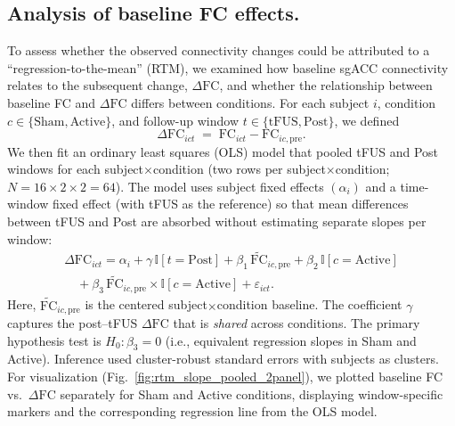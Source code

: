 \subsection*{Analysis of baseline FC effects.}
\noindent
To assess whether the observed connectivity changes could be attributed to a ``regression-to-the-mean'' (RTM), we examined how baseline sgACC connectivity relates to the subsequent change, \(\Delta \mathrm{FC}\), and whether the relationship between baseline FC and $\Delta \mathrm{FC}$ differs between conditions. For each subject \(i\), condition \(c\in\{\text{Sham},\text{Active}\}\), and follow-up window \(t\in\{\text{tFUS},\text{Post}\}\), we defined
\[
\Delta \mathrm{FC}_{ict} \;=\; \mathrm{FC}_{ict} - \mathrm{FC}_{ic,\mathrm{pre}}.
\]
We then fit an ordinary least squares (OLS) model that pooled tFUS and Post windows for each subject\(\times\)condition (two rows per subject\(\times\)condition; \(N=16\times 2\times 2=64\)). The model uses subject fixed effects \((\alpha_i)\) and a time-window fixed effect (with tFUS as the reference) so that mean differences between tFUS and Post are absorbed without estimating separate slopes per window:
\begin{equation}
    \begin{split}
    \Delta \mathrm{FC}_{ict}
    = \alpha_i + \gamma\,\mathbb{I}[t=\text{Post}]
    + \beta_1\,\widetilde{\mathrm{FC}}_{ic,\mathrm{pre}}
    + \beta_2\,\mathbb{I}[c=\text{Active}] \\
    \quad + \beta_3\,\widetilde{\mathrm{FC}}_{ic,\mathrm{pre}}\times \mathbb{I}[c=\text{Active}]
    + \varepsilon_{ict}.
    \end{split}
    \end{equation}
Here, \(\widetilde{\mathrm{FC}}_{ic,\mathrm{pre}}\) is the centered subject\(\times\)condition baseline. The coefficient \(\gamma\) captures the post--tFUS \(\Delta \mathrm{FC}\) that is \emph{shared} across conditions. The primary hypothesis test is \(H_0:\beta_3=0\) (i.e., equivalent regression slopes in Sham and Active). Inference used cluster-robust standard errors with subjects as clusters. For visualization (Fig.~\ref{fig:rtm_slope_pooled_2panel}), we plotted baseline FC vs.\ \(\Delta \mathrm{FC}\) separately for Sham and Active conditions, displaying window-specific markers and the corresponding regression line from the OLS model.


